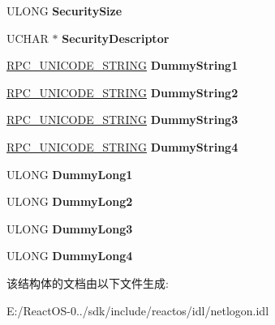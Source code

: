 \begin{DoxyCompactItemize}
U\+L\+O\+NG {\bfseries Security\+Size}
\item 
\mbox{\label{struct___n_e_t_l_o_g_o_n___d_e_l_t_a___g_r_o_u_p_a7aeab836196443517ccf8b7d11956438}} 
U\+C\+H\+AR $\ast$ {\bfseries Security\+Descriptor}
\item 
\mbox{\label{struct___n_e_t_l_o_g_o_n___d_e_l_t_a___g_r_o_u_p_af4a502f2e1568e4e9962cf2008d0f260}} 
\hyperlink{struct___r_p_c___u_n_i_c_o_d_e___s_t_r_i_n_g}{R\+P\+C\+\_\+\+U\+N\+I\+C\+O\+D\+E\+\_\+\+S\+T\+R\+I\+NG} {\bfseries Dummy\+String1}
\item 
\mbox{\label{struct___n_e_t_l_o_g_o_n___d_e_l_t_a___g_r_o_u_p_a2f71040adad8dcc2e500e3abec4367a1}} 
\hyperlink{struct___r_p_c___u_n_i_c_o_d_e___s_t_r_i_n_g}{R\+P\+C\+\_\+\+U\+N\+I\+C\+O\+D\+E\+\_\+\+S\+T\+R\+I\+NG} {\bfseries Dummy\+String2}
\item 
\mbox{\label{struct___n_e_t_l_o_g_o_n___d_e_l_t_a___g_r_o_u_p_ac6b1e09b826cdef0856b2e39989adad2}} 
\hyperlink{struct___r_p_c___u_n_i_c_o_d_e___s_t_r_i_n_g}{R\+P\+C\+\_\+\+U\+N\+I\+C\+O\+D\+E\+\_\+\+S\+T\+R\+I\+NG} {\bfseries Dummy\+String3}
\item 
\mbox{\label{struct___n_e_t_l_o_g_o_n___d_e_l_t_a___g_r_o_u_p_ad9338b7fc71fc1a2eb9cb7fc53fdf11a}} 
\hyperlink{struct___r_p_c___u_n_i_c_o_d_e___s_t_r_i_n_g}{R\+P\+C\+\_\+\+U\+N\+I\+C\+O\+D\+E\+\_\+\+S\+T\+R\+I\+NG} {\bfseries Dummy\+String4}
\item 
\mbox{\label{struct___n_e_t_l_o_g_o_n___d_e_l_t_a___g_r_o_u_p_aba905977b39d640603867ca52e90e927}} 
U\+L\+O\+NG {\bfseries Dummy\+Long1}
\item 
\mbox{\label{struct___n_e_t_l_o_g_o_n___d_e_l_t_a___g_r_o_u_p_a304806d65d53c9db574c6b6af57561f2}} 
U\+L\+O\+NG {\bfseries Dummy\+Long2}
\item 
\mbox{\label{struct___n_e_t_l_o_g_o_n___d_e_l_t_a___g_r_o_u_p_ae6cb7fe8d5a4e12aebf4ca1ca00ca655}} 
U\+L\+O\+NG {\bfseries Dummy\+Long3}
\item 
\mbox{\label{struct___n_e_t_l_o_g_o_n___d_e_l_t_a___g_r_o_u_p_a9a174d8205c45e13c2c6b3ed745b701a}} 
U\+L\+O\+NG {\bfseries Dummy\+Long4}
\end{DoxyCompactItemize}


该结构体的文档由以下文件生成\+:\begin{DoxyCompactItemize}
\item 
E\+:/\+React\+O\+S-\/0../sdk/include/reactos/idl/netlogon.\+idl\end{DoxyCompactItemize}
